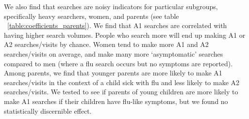\documentclass[12pt]{article}
\begin{document}


We also find that searches are noisy indicators for particular subgroups, specifically heavy searchers, women, and parents (see table ~\ref{table:coefficients_parents}). We find that A1 searches are correlated with having higher search volumes. People who search more will end up making A1 or A2 searches/visits by chance. Women tend to make more A1 and A2 searches/visits on average, and make many more `asymptomatic' searches compared to men (where a flu search occurs but no symptoms are reported). Among parents, we find that younger parents are more likely to make A1 searches/visits in the context of a child sick with flu and less likely to make A2 searches/visits. We tested to see if parents of young children are more likely to make A1 searches if their children have flu-like symptoms, but we found no statistically discernible effect.%
\end{document}
